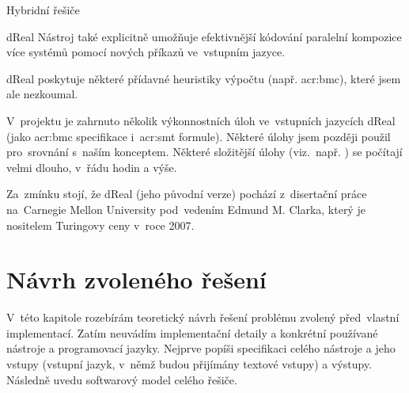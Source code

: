 \documentclass[thesis=M,czech]{FITthesis}[2012/06/26]
\newcommand{\acrlabel}[1]{acr:#1}
\newcommand{\acr}[1]{\acrshort{\acrlabel{#1}}}
\newcommand{\cit}[1]{\cite{#1}}
\begin{document}
\begin{section}{Hybridní řešiče}
\begin{paragraph}{dReal}
Nástroj také explicitně umožňuje efektivnější
kódování paralelní kompozice více systémů
pomocí nových příkazů ve~vstupním jazyce.

dReal poskytuje některé přídavné heuristiky výpočtu
(např. \acr{bmc}), které jsem ale nezkoumal.

V~projektu je zahrnuto několik výkonnostních úloh
ve~vstupních jazycích dReal
(jako \acr{bmc} specifikace i~\acr{smt} formule).
Některé úlohy jsem později použil pro~srovnání s~naším konceptem.
Některé složitější úlohy (viz.~např. \cit{dreal-smo-art})
se počítají velmi dlouho, v~řádu hodin a výše.

Za~zmínku stojí, že dReal (jeho původní verze)
pochází z~disertační práce
na~Carnegie Mellon University
pod~vedením Edmund M. Clarka,
který je nositelem Turingovy ceny
v~roce 2007.
\end{paragraph} %


\end{section} %



\chapter{Návrh zvoleného řešení}\label{ch:design}
V~této kapitole rozebírám teoretický návrh řešení problému
zvolený před~vlastní implementací.
Zatím neuvádím implementační detaily
a konkrétní používané nástroje a programovací jazyky.
Nejprve popíši specifikaci celého nástroje
a jeho vstupy (vstupní jazyk,
v~němž budou přijímány textové vstupy)
a výstupy.
Následně uvedu softwarový model celého řešiče.

\end{document}
